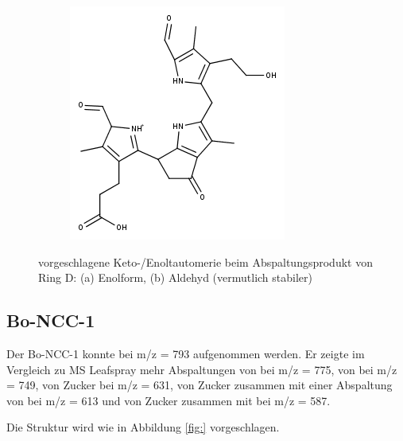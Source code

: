 \begin{figure}[!htbp]
\begin{subfigure}[b]{0.5\textwidth}
    \includegraphics[width=\textwidth]{figures/Kapitel7/Kataboliten/fragmentation_structures/VWA_Katabolit_647-CO2-RingD_480_MH_Ketoform.png}
    \caption{}
    \label{fig:DNCC2991}
  \end{subfigure}
  \caption[vorgeschlagene Keto-/Enoltautomerie der Ring D Abspaltung von Bo-NCC-3, Quelle: Autor]{vorgeschlagene Keto-/Enoltautomerie beim Abspaltungsprodukt von Ring D: (a) Enolform, (b) Aldehyd (vermutlich stabiler)}
\end{figure}

\subsection{Bo-NCC-1}

Der Bo-NCC-1 konnte bei m/z = 793 aufgenommen werden. Er zeigte im Vergleich zu MS Leafspray mehr Abspaltungen von  bei m/z = 775, von  bei m/z = 749, von Zucker bei m/z = 631, von Zucker zusammen mit einer Abspaltung von  bei m/z = 613 und von Zucker zusammen mit  bei m/z = 587. 

Die Struktur wird wie in Abbildung \ref{fig:} vorgeschlagen.

